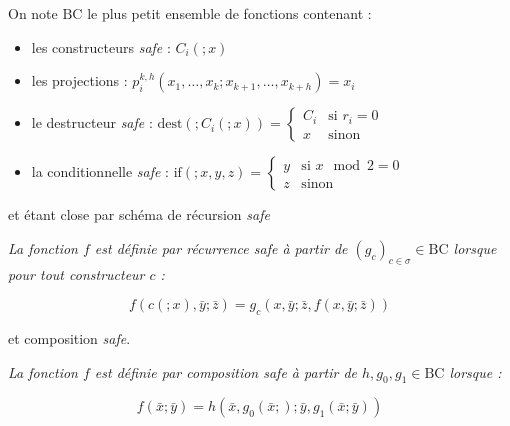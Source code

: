 \documentclass{report}
\begin{document}
			\begin{definition}
				\label{def:BC}
				On note $\text{BC}$ le plus petit ensemble de fonctions contenant :
				
				\begin{itemize}[itemsep=-1mm]
					\item 	les constructeurs \emph{safe} : $C_i\left(; x\right)$
					\item 	les projections : $p_i^{k,h} \left( x_1, \dots, x_{k}; x_{k+1}, \dots, x_{k+h}\right) = x_i$
					\item 	le destructeur \emph{safe} : $\text{dest} \left( ; C_i\left(; x\right) \right) = 
								\left\lbrace \begin{array}{ll}
									C_i	& \text{si $r_i = 0$} \\
									x	& \text{sinon}
								\end{array} \right.$
					\item 	la conditionnelle \emph{safe} : $\text{if}\left( ; x, y, z \right) = 
						\left\lbrace \begin{array}{ll}
							y	& \text{si $x \mod{2} = 0$} \\
							z	& \text{sinon}
						\end{array} \right.$
				\end{itemize}
				
				et étant close par schéma de récursion \emph{safe}
				
				
				\hspace{0.1\linewidth}\parbox{0.9\linewidth}{
					\small
					\emph{La fonction $f$ est définie par récurrence \emph{safe} à partir de $\left(g_c\right)_{c \in \sigma} \in \text{BC}$ lorsque pour tout constructeur $c$ :}
					
					\[
						f\left(c(;x), \bar{y} ; \bar{z}\right) = g_c\left( x, \bar{y} ; \bar{z}, f(x, \bar{y}; \bar{z}) \right)
					\]
				}
	
	
				et composition \emph{safe}.
				
				\hspace{0.1\linewidth}\parbox{0.9\linewidth}{
					\small
					\emph{La fonction $f$ est définie par composition \emph{safe} à partir de $h, g_0, g_1 \in \text{BC}$ lorsque :}
					
					\[
						f\left( \bar{x} ; \bar{y}\right) = h\left( \bar{x}, g_0( \bar{x}; ) ; \bar{y}, g_1( \bar{x}; \bar{y} ) \right)
					\]
				}
				
			\end{definition}
			
\end{document}
